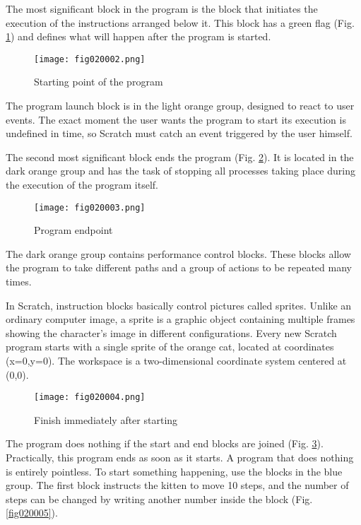 The most significant block in the program is the block that initiates the execution of the instructions arranged below it. This block has a green flag (Fig. \ref{fig020002}) and defines what will happen after the program is started.

\begin{figure}[H]
   \centering
   \texttt{[image: fig020002.png]}
   \caption{Starting point of the program}
\label{fig020002}
\end{figure}

The program launch block is in the light orange group, designed to react to user events. The exact moment the user wants the program to start its execution is undefined in time, so Scratch must catch an event triggered by the user himself.

The second most significant block ends the program (Fig. \ref{fig020003}). It is located in the dark orange group and has the task of stopping all processes taking place during the execution of the program itself.

\begin{figure}[H]
   \centering
   \texttt{[image: fig020003.png]}
   \caption{Program endpoint}
\label{fig020003}
\end{figure}

The dark orange group contains performance control blocks. These blocks allow the program to take different paths and a group of actions to be repeated many times.

In Scratch, instruction blocks basically control pictures called sprites. Unlike an ordinary computer image, a sprite is a graphic object containing multiple frames showing the character's image in different configurations. Every new Scratch program starts with a single sprite of the orange cat, located at coordinates (x=0,y=0). The workspace is a two-dimensional coordinate system centered at (0,0).

\begin{figure}[H]
   \centering
   \texttt{[image: fig020004.png]}
   \caption{Finish immediately after starting}
\label{fig020004}
\end{figure}

The program does nothing if the start and end blocks are joined (Fig. \ref{fig020004}). Practically, this program ends as soon as it starts. A program that does nothing is entirely pointless. To start something happening, use the blocks in the blue group. The first block instructs the kitten to move 10 steps, and the number of steps can be changed by writing another number inside the block (Fig. \ref{fig020005}).

